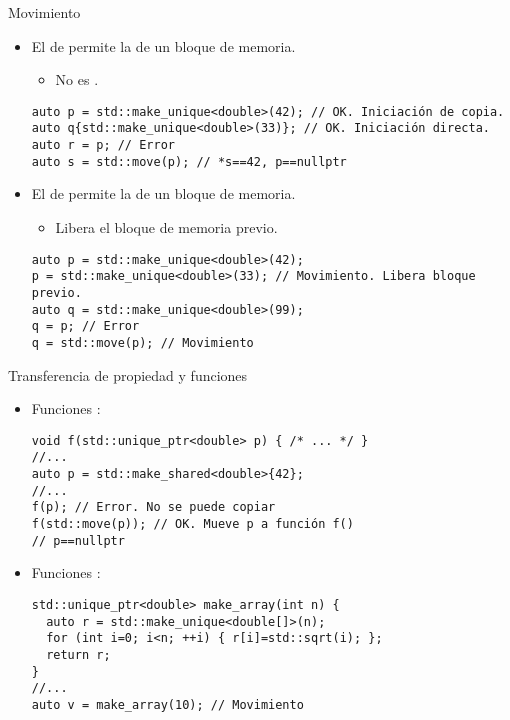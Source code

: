 \begin{frame}[t,fragile]{Movimiento}
\begin{itemize}
  \item El  de  permite
        la  de un bloque de memoria.
    \begin{itemize}
      \item No es .
    \end{itemize}
\begin{lstlisting}
auto p = std::make_unique<double>(42); // OK. Iniciación de copia.
auto q{std::make_unique<double>(33)}; // OK. Iniciación directa.
auto r = p; // Error
auto s = std::move(p); // *s==42, p==nullptr
\end{lstlisting}

  \item El  de 
        permite la  de un bloque de memoria.
    \begin{itemize}
      \item Libera el bloque de memoria previo.
    \end{itemize}
\begin{lstlisting}
auto p = std::make_unique<double>(42);
p = std::make_unique<double>(33); // Movimiento. Libera bloque previo.
auto q = std::make_unique<double>(99);
q = p; // Error
q = std::move(p); // Movimiento
\end{lstlisting}
\end{itemize}
\end{frame}

\begin{frame}[t,fragile]{Transferencia de propiedad y funciones}
\begin{itemize}
  \item Funciones :
\begin{lstlisting}
void f(std::unique_ptr<double> p) { /* ... */ }
//...
auto p = std::make_shared<double>{42};
//...
f(p); // Error. No se puede copiar
f(std::move(p)); // OK. Mueve p a función f()
// p==nullptr
\end{lstlisting}

  \item Funciones :
\begin{lstlisting}
std::unique_ptr<double> make_array(int n) {
  auto r = std::make_unique<double[]>(n);
  for (int i=0; i<n; ++i) { r[i]=std::sqrt(i); };
  return r; 
}
//...
auto v = make_array(10); // Movimiento
\end{lstlisting}
\end{itemize}
\end{frame}
